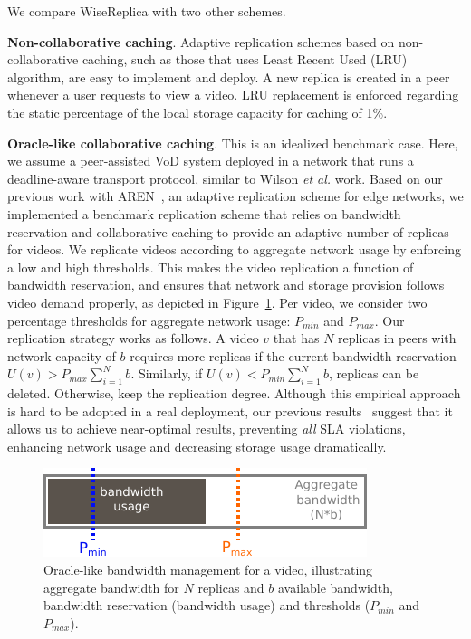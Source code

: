 We compare WiseReplica with two other schemes.

\noindent
{\bf Non-collaborative caching}. Adaptive replication schemes based on non-collaborative caching, such as those that uses Least Recent Used (LRU) algorithm, are easy to implement and deploy. A new replica is created in a peer whenever a user requests to view a video. LRU replacement is enforced regarding the static percentage of the local storage capacity for caching of 1\%.

\noindent
{\bf Oracle-like collaborative caching}. This is an idealized benchmark case. Here, we assume a peer-assisted VoD system deployed in a network that runs a deadline-aware transport protocol, similar to Wilson \emph{et al.}\cite{d3_sigcomm2011} work. Based on our previous work with AREN~\cite{silvestre_aren_icpads12}, an adaptive replication scheme for edge networks, we implemented a benchmark replication scheme that relies on bandwidth reservation and collaborative
caching to provide an adaptive number of replicas for videos. We replicate videos according to aggregate network usage by enforcing a low and high thresholds. This makes the video replication a function of bandwidth reservation, and ensures that network and storage provision follows video demand properly, as depicted in Figure~\ref{fig:oracle_like}. Per video, we consider two percentage thresholds for aggregate network usage: $P_{min}$ and $P_{max}$. Our replication strategy works as follows. A video $v$ that has $N$ replicas in peers with network capacity of $b$ requires more replicas if the current bandwidth reservation $U(v) > P_{max} \sum_{i=1}^N b$. Similarly, if $U(v) < P_{min} \sum_{i=1}^N b$, replicas can be deleted. Otherwise, keep the replication degree. Although this empirical approach is hard to be adopted in a real deployment, our previous results~\cite{silvestre_aren_icpads12} suggest that it allows us to achieve near-optimal results, preventing \emph{all} SLA violations, enhancing network usage and decreasing storage usage dramatically.  

\begin{figure}
  \centering
     \includegraphics[width=.6\textwidth]{inputs/img/oracle_like}
  \caption{Oracle-like bandwidth management for a video, illustrating aggregate bandwidth for $N$ replicas and $b$ available bandwidth, bandwidth reservation (bandwidth usage) and thresholds ($P_{min}$ and $P_{max}$).}
  \label{fig:oracle_like}
\end{figure}


